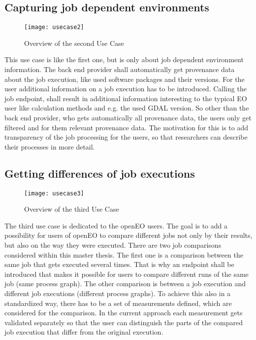 \documentclass[draft,final]{vutinfth} %
\begin{document}
\subsection{Capturing job dependent environments}\label{UseCase2}
\begin{figure}[h]
	\centering
	\texttt{[image: usecase2]}
	\caption{Overview of the second Use Case}
	\label{fig:usecase2} %
\end{figure}
This use case is like the first one, but is only about job dependent environment information. The back end provider shall automatically get provenance data about the job execution, like used software packages and their versions. For the user additional information on a job execution has to be introduced. Calling the job endpoint, shall result in additional information interesting to the typical EO user like calculation methods and e.g. the used GDAL version. So other than the back end provider, who gets automatically all provenance data, the users only get filtered and for them relevant provenance data. The motivation for this is to add transparency of the job processing for the users, so that researchers can describe their processes in more detail. 
\subsection{Getting differences of job executions}\label{UseCase3}
\begin{figure}[h]
	\centering
	\texttt{[image: usecase3]}
	\caption{Overview of the third Use Case}
	\label{fig:usecase3} %
\end{figure}
The third use case is dedicated to the openEO users. The goal is to add a possibility for users of openEO to compare different jobs not only by their results, but also on the way they were executed. There are two job comparisons considered within this master thesis. The first one is a comparison between the same job that gets executed several times. That is why an endpoint shall be introduced that makes it possible for  users to compare different runs of the same job (same process graph). The other comparison is between a job execution and different job executions (different process graphs). To achieve this also in a standardized way, there has to be a set of measurements defined, which are considered for the comparison. In the current approach each measurement gets validated separately so that the user can distinguish the parts of the compared job execution that differ from the original execution. 
\end{document}
